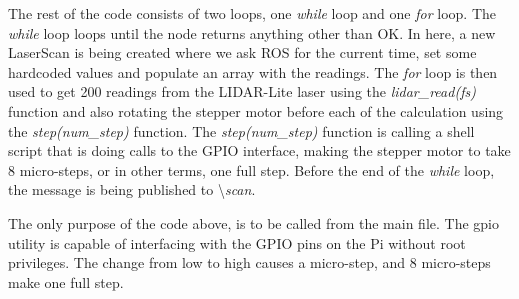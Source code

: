 The rest of the code consists of two loops, one \textit{while} loop and one \textit{for} loop. The \textit{while} loop loops until the node returns anything other than OK. In here, a new LaserScan is being created where we ask ROS for the current time, set some hardcoded values and populate an array with the readings. The \textit{for} loop is then used to get 200 readings from the LIDAR-Lite laser using the \textit{lidar\_read(fs)} function and also rotating the stepper motor before each of the calculation using the \textit{step(num\_step)} function. The \textit{step(num\_step)} function is calling a shell script that is doing calls to the GPIO interface, making the stepper motor to take 8 micro-steps, or in other terms, one full step. Before the end of the \textit{while} loop, the message is being published to \textbackslash\textit{scan}.



The only purpose of the code above, is to be called from the main file. The gpio utility is capable of interfacing with the GPIO pins on the Pi without root privileges. The change from low to high causes a micro-step, and 8 micro-steps make one full step.
